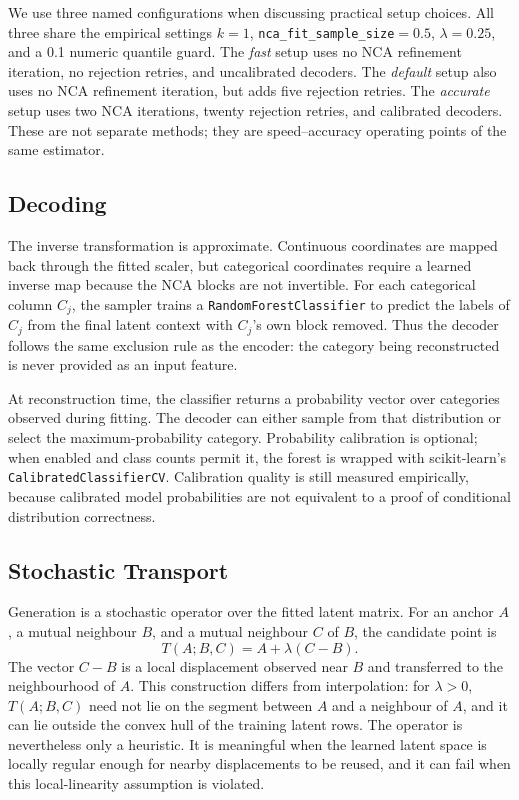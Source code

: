 We use three named configurations when discussing practical setup choices. All
three share the empirical settings $k=1$,
\texttt{nca\_fit\_sample\_size}$=0.5$, $\lambda=0.25$, and a 0.1 numeric
quantile guard. The \emph{fast}
setup uses no NCA refinement iteration, no rejection retries, and uncalibrated
decoders. The \emph{default} setup also uses no NCA refinement iteration, but
adds five rejection retries. The \emph{accurate} setup uses two NCA iterations,
twenty rejection retries, and calibrated decoders. These are not separate
methods; they are speed--accuracy operating points of the same estimator.

\subsection{Decoding}

The inverse transformation is approximate. Continuous coordinates are mapped
back through the fitted scaler, but categorical coordinates require a learned
inverse map because the NCA blocks are not invertible. For each categorical
column $C_j$, the sampler trains a \texttt{RandomForestClassifier} to predict
the labels of $C_j$ from the final latent context with $C_j$'s own block
removed. Thus the decoder follows the same exclusion rule as the encoder:
the category being reconstructed is never provided as an input feature.

At reconstruction time, the classifier returns a probability vector over
categories observed during fitting. The decoder can either sample from that
distribution or select the maximum-probability category. Probability
calibration is optional; when enabled and class counts permit it, the forest is
wrapped with scikit-learn's \texttt{CalibratedClassifierCV}. Calibration quality
is still measured empirically, because calibrated model probabilities are not
equivalent to a proof of conditional distribution correctness.

\subsection{Stochastic Transport}

Generation is a stochastic operator over the fitted latent matrix. For an
anchor $A$, a mutual neighbour $B$, and a mutual neighbour $C$ of $B$, the
candidate point is
\[
  T(A;B,C)=A+\lambda(C-B).
\]
The vector $C-B$ is a local displacement observed near $B$ and transferred to
the neighbourhood of $A$. This construction differs from interpolation:
for $\lambda>0$, $T(A;B,C)$ need not lie on the segment between $A$ and a
neighbour of $A$, and it can lie outside the convex hull of the training latent
rows. The operator is nevertheless only a heuristic. It is meaningful when the
learned latent space is locally regular enough for nearby displacements to be
reused, and it can fail when this local-linearity assumption is violated.

